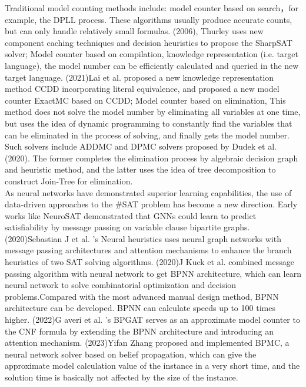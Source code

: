 Traditional model counting methods include: model counter based on search，for example, the DPLL process. These algorithms usually produce accurate counts, but can only handle relatively small formulas. (2006), Thurley uses new component caching techniques and decision heuristics to propose the SharpSAT solver\cite{B9}; Model counter based on compilation, knowledge representation (i.e. target language), the model number can be efficiently calculated and queried in the new target language.  (2021)Lai et al. proposed a new knowledge representation method CCDD\cite{A21} incorporating literal equivalence, and proposed a new model counter ExactMC\cite{A22} based on CCDD; Model counter based on elimination, This method does not solve the model number by eliminating all variables at one time, but uses the idea of dynamic programming to constantly find the variables that can be eliminated in the process of solving, and finally gets the model number. Such solvers include ADDMC\cite{A20} and DPMC\cite{A23} solvers proposed by Dudek et al. (2020). The former completes the elimination process by algebraic decision graph and heuristic method, and the latter uses the idea of tree decomposition to construct Join-Tree for elimination.\\
As neural networks have demonstrated superior learning capabilities, the use of data-driven approaches to the \#SAT problem has become a new direction. Early works like NeuroSAT\cite{A24} demonstrated that GNNs could learn to predict satisfiability by message passing on  variable clause bipartite graphs. (2020)Sebastian J et al. 's Neural heuristics\cite{A25} uses neural graph networks with message passing architectures and attention mechanisms to enhance the branch heuristics of two SAT solving algorithms. (2020)J Kuck et al. combined message passing algorithm with neural network to get BPNN architecture, which can learn neural network to solve combinatorial optimization and decision problems.Compared with the most advanced manual design method, BPNN architecture can be developed. BPNN can calculate speeds up to 100 times higher. (2022)G averi et al. 's BPGAT\cite{A26} serves as an approximate model counter to the CNF formula by extending the BPNN architecture and introducing an attention mechanism. (2023)Yifan Zhang proposed and implemented BPMC\cite{M1}, a neural network solver based on belief propagation, which can give the approximate model calculation value of the instance in a very short time, and the solution time is basically not affected by the size of the instance.